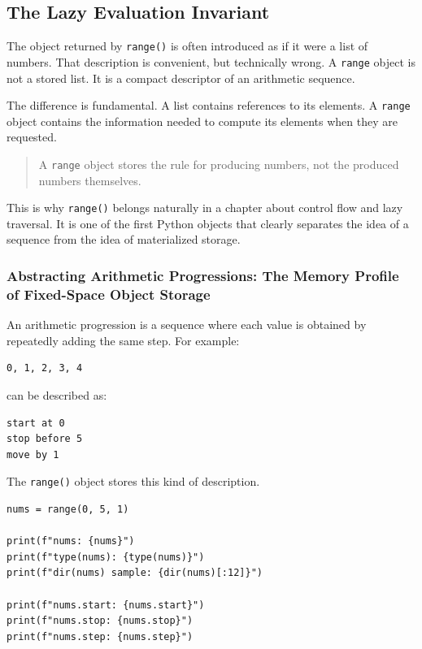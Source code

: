 \subsection{The Lazy Evaluation Invariant}

The object returned by \texttt{range()} is often introduced as if it were a list of numbers. That description is convenient, but technically wrong. A \texttt{range} object is not a stored list. It is a compact descriptor of an arithmetic sequence.

The difference is fundamental. A list contains references to its elements. A \texttt{range} object contains the information needed to compute its elements when they are requested.

\begin{quote}
A \texttt{range} object stores the rule for producing numbers, not the produced numbers themselves.
\end{quote}

This is why \texttt{range()} belongs naturally in a chapter about control flow and lazy traversal. It is one of the first Python objects that clearly separates the idea of a sequence from the idea of materialized storage.

\subsubsection{Abstracting Arithmetic Progressions: The Memory Profile of Fixed-Space Object Storage}

An arithmetic progression is a sequence where each value is obtained by repeatedly adding the same step. For example:

\begin{verbatim}
0, 1, 2, 3, 4
\end{verbatim}

can be described as:

\begin{verbatim}
start at 0
stop before 5
move by 1
\end{verbatim}

The \texttt{range()} object stores this kind of description.

\begin{verbatim}
nums = range(0, 5, 1)

print(f"nums: {nums}")
print(f"type(nums): {type(nums)}")
print(f"dir(nums) sample: {dir(nums)[:12]}")

print(f"nums.start: {nums.start}")
print(f"nums.stop: {nums.stop}")
print(f"nums.step: {nums.step}")
\end{verbatim}

